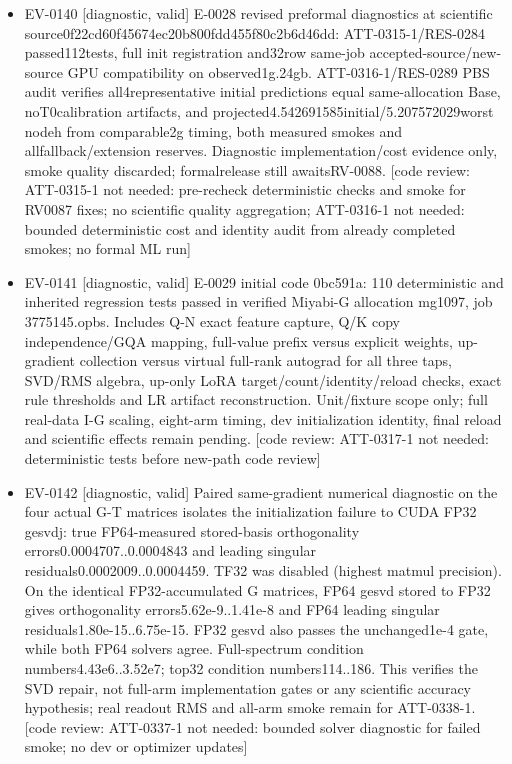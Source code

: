 \documentclass[11pt]{article}
\begin{document}
\begin{itemize}
\item EV-0140 [diagnostic, valid] E-0028 revised preformal diagnostics at scientific source0f22cd60f45674ec20b800fdd455f80c2b6d46dd: ATT-0315-1/RES-0284 passed112tests, full init registration and32row same-job accepted-source/new-source GPU compatibility on observed1g.24gb. ATT-0316-1/RES-0289 PBS audit verifies all4representative initial predictions equal same-allocation Base, noT0calibration artifacts, and projected4.542691585initial/5.207572029worst nodeh from comparable2g timing, both measured smokes and allfallback/extension reserves. Diagnostic implementation/cost evidence only, smoke quality discarded; formalrelease still awaitsRV-0088. [code review: ATT-0315-1 not needed: pre-recheck deterministic checks and smoke for RV0087 fixes; no scientific quality aggregation; ATT-0316-1 not needed: bounded deterministic cost and identity audit from already completed smokes; no formal ML run]
\item EV-0141 [diagnostic, valid] E-0029 initial code 0bc591a: 110 deterministic and inherited regression tests passed in verified Miyabi-G allocation mg1097, job 3775145.opbs. Includes Q-N exact feature capture, Q/K copy independence/GQA mapping, full-value prefix versus explicit weights, up-gradient collection versus virtual full-rank autograd for all three taps, SVD/RMS algebra, up-only LoRA target/count/identity/reload checks, exact rule thresholds and LR artifact reconstruction. Unit/fixture scope only; full real-data I-G scaling, eight-arm timing, dev initialization identity, final reload and scientific effects remain pending. [code review: ATT-0317-1 not needed: deterministic tests before new-path code review]
\item EV-0142 [diagnostic, valid] Paired same-gradient numerical diagnostic on the four actual G-T matrices isolates the initialization failure to CUDA FP32 gesvdj: true FP64-measured stored-basis orthogonality errors0.0004707..0.0004843 and leading singular residuals0.0002009..0.0004459. TF32 was disabled (highest matmul precision). On the identical FP32-accumulated G matrices, FP64 gesvd stored to FP32 gives orthogonality errors5.62e-9..1.41e-8 and FP64 leading singular residuals1.80e-15..6.75e-15. FP32 gesvd also passes the unchanged1e-4 gate, while both FP64 solvers agree. Full-spectrum condition numbers4.43e6..3.52e7; top32 condition numbers114..186. This verifies the SVD repair, not full-arm implementation gates or any scientific accuracy hypothesis; real readout RMS and all-arm smoke remain for ATT-0338-1. [code review: ATT-0337-1 not needed: bounded solver diagnostic for failed smoke; no dev or optimizer updates]

\end{itemize}
\end{document}
